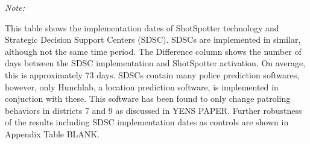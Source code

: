 \begin{table}[H]
\begin{threeparttable}
\begin{tabular}[t]{rlllll}
\bottomrule
\end{tabular}
\begin{tablenotes}
\item \textit{Note: } 
\item This table shows                      the implementation dates of ShotSpotter technology and                      Strategic Decision Support Centers (SDSC). SDSCs are implemented                      in similar, although not the same time period.                      The Difference column shows the number of days between                      the SDSC implementation and ShotSpotter activation. On                      average, this is approximately                      73 days. SDSCs contain many police prediction softwares, however,                      only Hunchlab, a location prediction software,                      is implemented in conjuction with these. This software has been                      found to only change patroling behaviors in                      districts 7 and 9 as discussed in YENS PAPER. Further                      robustness of the results including SDSC implementation dates                      as controls are shown in Appendix Table BLANK.
\end{tablenotes}
\end{threeparttable}
\end{table}
